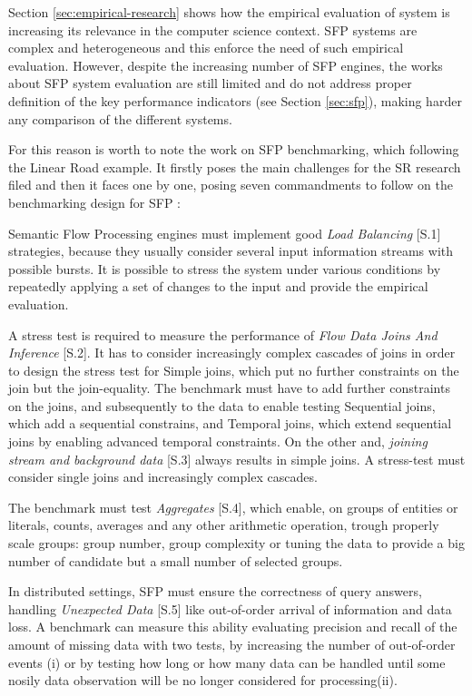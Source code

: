 Section \ref{sec:empirical-research} shows how the empirical evaluation of system is increasing its relevance in the computer science context. SFP systems are complex and heterogeneous and this enforce the need of such empirical evaluation. However,  despite the increasing number of SFP engines, the works about SFP system evaluation are still limited and do not address proper definition of the key performance indicators (see Section \ref{sec:sfp}), making harder any comparison of  the different systems.

For this reason is worth to note the work on SFP benchmarking, which following the Linear Road example. It firstly poses the main challenges for the SR research filed and then it faces one by one, posing seven commandments to follow on the benchmarking design for SFP \cite{DBLP:conf/esws/ScharrenbachUMVB13}:

Semantic Flow Processing engines must implement good \textit{Load Balancing} [S.1] strategies, because they usually consider several input information streams with possible bursts. It is possible to stress the system under various conditions by repeatedly applying a set of changes to the input and provide the empirical evaluation.

A stress test is required to measure the performance of \textit{Flow Data Joins And Inference} [S.2]. It has to consider increasingly complex cascades of joins in order to design the stress test for Simple joins, which put no further constraints on the join but the join-equality. The benchmark must have to add further constraints on the joins, and subsequently to  the data to enable testing Sequential joins, which add a sequential constrains, and Temporal joins, which extend sequential joins by enabling advanced temporal constraints. On the other and, \textit{joining stream and background data} [S.3] always results in simple joins. A stress-test must consider single joins and increasingly complex cascades.

The benchmark must test \textit{Aggregates} [S.4], which enable, on groups of entities or literals, counts, averages and any other arithmetic operation, trough properly scale groups: group number, group complexity or tuning the data to provide a big number of candidate but a small number of selected groups.

In distributed settings, SFP must ensure the correctness of query answers, handling \textit{Unexpected Data} [S.5] like out-of-order arrival of information and data loss.  A benchmark can measure this ability evaluating precision and recall of the amount of missing data with two tests, by increasing the number of out-of-order events (i) or by testing how long or how many data can be handled until some nosily data observation will be no longer considered for processing(ii).


